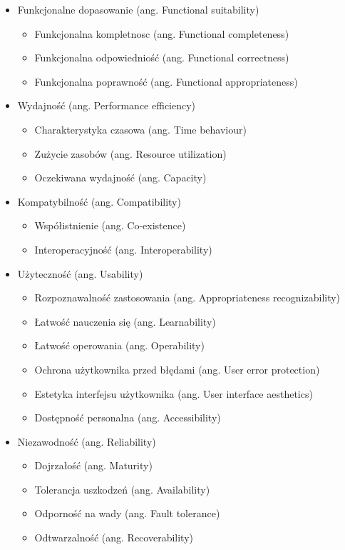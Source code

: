 \begin{itemize}
\item Funkcjonalne dopasowanie (ang. Functional suitability)
	\begin{itemize}
	\item Funkcjonalna kompletnosc (ang. Functional completeness)
	\item Funkcjonalna odpowiedniość (ang. Functional correctness)
	\item Funkcjonalna poprawność (ang. Functional appropriateness)
	\end{itemize}
\item Wydajność (ang. Performance efficiency)
	\begin{itemize}
	\item Charakterystyka czasowa (ang. Time behaviour)
	\item Zużycie zasobów (ang. Resource utilization)
	\item Oczekiwana wydajność (ang. Capacity)
	\end{itemize}
\item Kompatybilność (ang. Compatibility)
	\begin{itemize}
	\item Współistnienie (ang. Co-existence)
	\item Interoperacyjność (ang. Interoperability)
	\end{itemize}
\item Użyteczność (ang. Usability)
	\begin{itemize}
	\item Rozpoznawalność zastosowania (ang. Appropriateness recognizability)
	\item Łatwość nauczenia się (ang. Learnability)
	\item Łatwość operowania (ang. Operability)
	\item Ochrona użytkownika przed błędami (ang. User error protection)
	\item Estetyka interfejsu użytkownika (ang. User interface aesthetics)
	\item Dostępność personalna (ang. Accessibility)
	\end{itemize}
\item Niezawodność (ang. Reliability)
	\begin{itemize}
	\item Dojrzałość (ang. Maturity)
	\item Tolerancja uszkodzeń (ang. Availability)
	\item Odporność na wady (ang. Fault tolerance)
	\item Odtwarzalność (ang. Recoverability)

\end{itemize}
\end{itemize}
